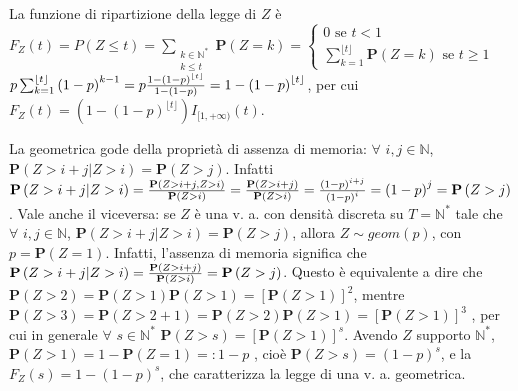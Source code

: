 \documentclass{article}
\begin{document}
\begin{description}
\item La funzione di ripartizione della legge di $Z$ \`{e} $F_{Z}\left(
t\right) =P\left( Z\leq t\right) =\sum_{\substack{ k\in 
\mathbb{N}
^{\ast }  \\ k\leq t}}\mathbf{P}\left( Z=k\right) =\left\{ 
\begin{array}{c}
0\text{ se }t<1 \\ 
\sum_{k=1}^{\lfloor t\rfloor }\mathbf{P}\left( Z=k\right) \text{ se }t\geq 1%
\end{array}%
\right. $ $p\sum_{k=1}^{\lfloor t\rfloor }\left( 1-p\right) ^{k-1}=p\frac{%
1-\left( 1-p\right) ^{\lfloor t\rfloor }}{1-\left( 1-p\right) }=1-\left(
1-p\right) ^{\lfloor t\rfloor }$, per cui $F_{Z}\left( t\right) =\left(
1-\left( 1-p\right) ^{\lfloor t\rfloor }\right) I_{[1,+\infty )}\left(
t\right) $.

\item La geometrica gode della propriet\`{a} di assenza di memoria: $\forall 
$ $i,j\in 
\mathbb{N}
$, $\mathbf{P}\left( Z>i+j|Z>i\right) =\mathbf{P}\left( Z>j\right) $.
Infatti $\mathbf{P}\left( Z>i+j|Z>i\right) =\frac{\mathbf{P}\left(
Z>i+j,Z>i\right) }{\mathbf{P}\left( Z>i\right) }=\frac{\mathbf{P}\left(
Z>i+j\right) }{\mathbf{P}\left( Z>i\right) }=\frac{\left( 1-p\right) ^{i+j}}{%
\left( 1-p\right) ^{i}}=\left( 1-p\right) ^{j}=\mathbf{P}\left( Z>j\right) $%
. Vale anche il viceversa: se $Z$ \`{e} una v. a. con densit\`{a} discreta
su $T=%
\mathbb{N}
^{\ast }$ tale che $\forall $ $i,j\in 
\mathbb{N}
$, $\mathbf{P}\left( Z>i+j|Z>i\right) =\mathbf{P}\left( Z>j\right) $, allora 
$Z\sim geom\left( p\right) $, con $p=\mathbf{P}\left( Z=1\right) $. Infatti,
l'assenza di memoria significa che $\mathbf{P}\left( Z>i+j|Z>i\right) =\frac{%
\mathbf{P}\left( Z>i+j\right) }{\mathbf{P}\left( Z>i\right) }=\mathbf{P}%
\left( Z>j\right) $. Questo \`{e} equivalente a dire che $\mathbf{P}\left(
Z>2\right) =\mathbf{P}\left( Z>1\right) \mathbf{P}\left( Z>1\right) =\left[ 
\mathbf{P}\left( Z>1\right) \right] ^{2}$, mentre $\mathbf{P}\left(
Z>3\right) =\mathbf{P}\left( Z>2+1\right) =\mathbf{P}\left( Z>2\right) 
\mathbf{P}\left( Z>1\right) =\left[ \mathbf{P}\left( Z>1\right) \right] ^{3}$%
, per cui in generale $\forall $ $s\in 
\mathbb{N}
^{\ast }$ $\mathbf{P}\left( Z>s\right) =\left[ \mathbf{P}\left( Z>1\right) %
\right] ^{s}$. Avendo $Z$ supporto $%
\mathbb{N}
^{\ast }$, $\mathbf{P}\left( Z>1\right) =1-\mathbf{P}\left( Z=1\right) =:1-p$%
, cio\`{e} $\mathbf{P}\left( Z>s\right) =\left( 1-p\right) ^{s}$, e la $%
F_{Z}\left( s\right) =1-\left( 1-p\right) ^{s}$, che caratterizza la legge
di una v. a. geometrica.


\end{description}
\end{document}
